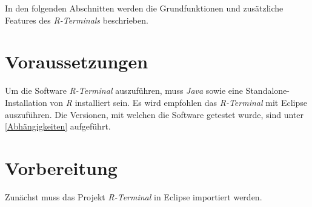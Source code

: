 \documentclass[a4paper, 12pt]{report} %
\begin{document}

In den folgenden Abschnitten werden die Grundfunktionen und zusätzliche Features des \textit{R-Terminals} beschrieben. 

\section{Voraussetzungen}

Um die Software \textit{R-Terminal} auszuführen, muss \textit{Java} sowie eine Standalone-Installation von \textit{R} installiert sein. Es wird empfohlen das \textit{R-Terminal} mit Eclipse auszuführen.
Die Versionen, mit welchen die Software getestet wurde, sind unter \ref{Abhängigkeiten} aufgeführt. 

\section{Vorbereitung} \label{swtanwender}

Zunächst muss  das Projekt \textit{R-Terminal} in Eclipse importiert werden.
\end{document}
